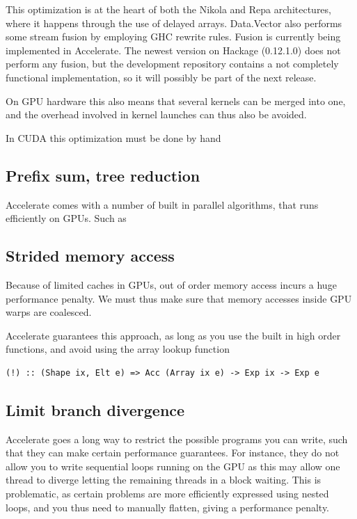 This optimization is at the heart of both the Nikola and Repa
architectures, where it happens through the use of delayed
arrays. Data.Vector also performs some stream fusion by employing GHC
rewrite rules. Fusion is currently being implemented in
Accelerate. The newest version on Hackage (0.12.1.0) does not perform
any fusion, but the development repository contains a not completely
functional implementation, so it will possibly be part of the next
release.

On GPU hardware this also means that several kernels can be merged
into one, and the overhead involved in kernel launches can thus also
be avoided.

In CUDA this optimization must be done by hand 

\subsection{Prefix sum, tree reduction}
Accelerate comes with a number of built in parallel algorithms, that
runs efficiently on GPUs. Such as

\subsection{Strided memory access}
Because of limited caches in GPUs, out of order memory access incurs a
huge performance penalty. We must thus make sure that memory accesses
inside GPU warps are coalesced.

Accelerate guarantees this approach, as long as you use the built in
high order functions, and avoid using the array lookup function
\begin{verbatim}
(!) :: (Shape ix, Elt e) => Acc (Array ix e) -> Exp ix -> Exp e
\end{verbatim}


\subsection{Limit branch divergence}
Accelerate goes a long way to restrict the possible programs you can
write, such that they can make certain performance guarantees. For
instance, they do not allow you to write sequential loops running on
the GPU as this may allow one thread to diverge letting the remaining
threads in a block waiting. This is problematic, as certain problems
are more efficiently expressed using nested loops, and you thus need
to manually flatten, giving a performance penalty.

